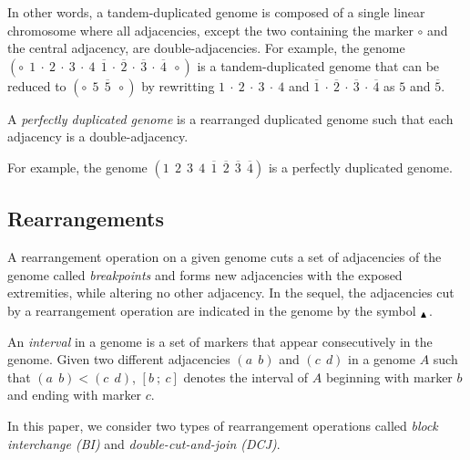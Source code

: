 \documentclass{llncs}
\newcommand{\breakpoint}{ \textsubscript{$\textcolor{black}{\blacktriangle}$} }
\newcommand{\fst}[1]{ \ensuremath{#1} }
\newcommand{\snd}[1]{ \ensuremath{\overline{#1}} }
\begin{document}
In other words, a tandem-duplicated genome is composed of a single linear chromosome where all adjacencies, except the two containing the marker $\circ$ and the central adjacency, are double-adjacencies.
For example, the genome $(\circ~~\fst{1}~\cdot~\fst{2}~\cdot~\fst{3}~\cdot~\fst{4}~~\snd{1}~\cdot~\snd{2}~\cdot~\snd{3}~\cdot~\snd{4}~~\circ )$ is a tandem-duplicated genome that can be reduced to 
$(\circ~~\fst{5}~~\snd{5}~~\circ )$
by rewritting $\fst{1}~\cdot~\fst{2}~\cdot~\fst{3}~\cdot~\fst{4}$ and $\snd{1}~\cdot~\snd{2}~\cdot~\snd{3}~\cdot~\snd{4}$ as  $\fst{5}$ and $\snd{5}$.



\begin{definition}
A \emph{perfectly duplicated genome} is a rearranged duplicated genome such that each adjacency is a double-adjacency. 
\end{definition}


For example, the genome $(1~~{2}~~{3}~~4~~\snd{1}~~\snd{2}~~\snd{3}~~\snd{4})$ is a perfectly duplicated genome.


\subsection*{Rearrangements}
\label{sec:rearrangement}

A rearrangement operation on a given genome cuts a set of adjacencies of the 
genome called \emph{breakpoints} and forms new adjacencies with the exposed 
extremities, while altering no other adjacency. In the sequel, the adjacencies 
cut by a rearrangement operation are indicated in the genome by the symbol $\breakpoint$. 
  
An \emph{interval} in a genome is a set of markers that appear consecutively 
in the genome. Given two different adjacencies $(a~~b)$ and $(c~~d)$ in a genome 
$A$ such that $(a~~b) < (c~~d)$, $[b~;~c]$ denotes the interval of $A$ beginning 
with marker $b$ and ending with marker $c$.

In this paper, we consider two types of rearrangement operations called \emph{block interchange (BI)} and  \emph{double-cut-and-join (DCJ)}.
\end{document}
